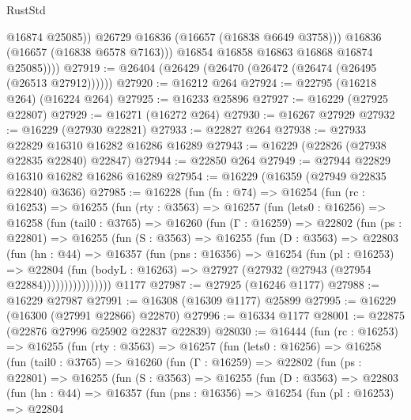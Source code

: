 \begin{lexlean}{RustStd}
\begin{coremodule}
                    @16874
                    @25085))
                @26729
                @16836
                (@16657 (@16838 @6649 @3758)))
              @16836
              (@16657 (@16838 @6578 @7163)))
            @16854
            @16858
            @16863
            @16868
            @16874
            @25085))))
@27919 := @26404 (@26429 (@26470 (@26472 (@26474 (@26495 (@26513 @27912))))))
@27920 := @16212 @264
@27924 := @22795 (@16218 @264) (@16224 @264)
@27925 := @16233 @25896
@27927 := @16229 (@27925 @22807)
@27929 := @16271 (@16272 @264)
@27930 := @16267 @27929
@27932 := @16229 (@27930 @22821)
@27933 := @22827 @264
@27938 := @27933 @22829 @16310 @16282 @16286 @16289
@27943 := @16229 (@22826 (@27938 @22835 @22840) @22847)
@27944 := @22850 @264
@27949 := @27944 @22829 @16310 @16282 @16286 @16289
@27954 := @16229 (@16359 (@27949 @22835 @22840) @3636)
@27985 := @16228
    (fun (fn : @74) =>
    @16254
      (fun (rc : @16253) =>
      @16255
        (fun (rty : @3563) =>
        @16257
          (fun (lets0 : @16256) =>
          @16258
            (fun (tail0 : @3765) =>
            @16260
              (fun (Γ : @16259) =>
              @22802
                (fun (ps : @22801) =>
                @16255
                  (fun (S : @3563) =>
                  @16255
                    (fun (D : @3563) =>
                    @22803
                      (fun (hn : @44) =>
                      @16357
                        (fun (pns : @16356) =>
                        @16254
                          (fun (pl : @16253) =>
                          @22804
                            (fun (bodyL : @16263) =>
                            @27927 (@27932 (@27943 (@27954 @22884))))))))))))))))
    @1177
@27987 := @27925 (@16246 @1177)
@27988 := @16229 @27987
@27991 := @16308 (@16309 @1177) @25899
@27995 := @16229 (@16300 (@27991 @22866) @22870)
@27996 := @16334 @1177
@28001 := @22875 (@22876 @27996 @25902 @22837 @22839)
@28030 := @16444
    (fun (rc : @16253) =>
    @16255
      (fun (rty : @3563) =>
      @16257
        (fun (lets0 : @16256) =>
        @16258
          (fun (tail0 : @3765) =>
          @16260
            (fun (Γ : @16259) =>
            @22802
              (fun (ps : @22801) =>
              @16255
                (fun (S : @3563) =>
                @16255
                  (fun (D : @3563) =>
                  @22803
                    (fun (hn : @44) =>
                    @16357
                      (fun (pns : @16356) =>
                      @16254
                        (fun (pl : @16253) =>
                        @22804

\end{coremodule}
\end{lexlean}
